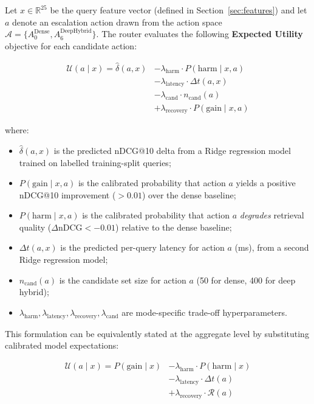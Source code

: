 \documentclass[journal]{IEEEtran}
\begin{document}
Let $x \in \mathbb{R}^{25}$ be the query feature vector (defined
in Section~\ref{sec:features}) and let $a$ denote an escalation
action drawn from the action space
$\mathcal{A} = \{A_0^{\text{Dense}}, A_6^{\text{DeepHybrid}}\}$.
The router evaluates the following \textbf{Expected Utility}
objective for each candidate action:

\begin{equation}
\label{eq:utility}
\begin{aligned}
\mathcal{U}(a \mid x) = \hat{\delta}(a,x)
  &- \lambda_{\text{harm}} \cdot P(\text{harm} \mid x, a) \\
  &- \lambda_{\text{latency}} \cdot \Delta t(a, x) \\
  &- \lambda_{\text{cand}} \cdot n_{\text{cand}}(a) \\
  &+ \lambda_{\text{recovery}} \cdot P(\text{gain} \mid x, a)
\end{aligned}
\end{equation}

where:
\begin{itemize}
  \item $\hat{\delta}(a,x)$ is the predicted nDCG@10 delta from a
        Ridge regression model trained on labelled training-split
        queries;
  \item $P(\text{gain} \mid x, a)$ is the calibrated probability
        that action $a$ yields a positive nDCG@10 improvement
        ($>\!0.01$) over the dense baseline;
  \item $P(\text{harm} \mid x, a)$ is the calibrated probability
        that action $a$ \emph{degrades} retrieval quality
        ($\Delta\text{nDCG} < -0.01$) relative to the dense baseline;
  \item $\Delta t(a, x)$ is the predicted per-query latency for
        action $a$ (ms), from a second Ridge regression model;
  \item $n_{\text{cand}}(a)$ is the candidate set size for action
        $a$ (50 for dense, 400 for deep hybrid);
  \item $\lambda_{\text{harm}}, \lambda_{\text{latency}},
        \lambda_{\text{recovery}}, \lambda_{\text{cand}}$ are
        mode-specific trade-off hyperparameters.
\end{itemize}

This formulation can be equivalently stated at the aggregate level
by substituting calibrated model expectations:

\begin{equation}
\label{eq:utility_full}
\begin{aligned}
\mathcal{U}(a \mid x) = P(\text{gain} \mid x)
  &- \lambda_{\text{harm}} \cdot P(\text{harm} \mid x) \\
  &- \lambda_{\text{latency}} \cdot \Delta t(a) \\
  &+ \lambda_{\text{recovery}} \cdot \mathcal{R}(a)
\end{aligned}
\end{equation}
\end{document}
